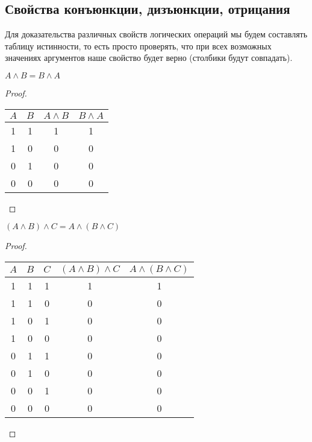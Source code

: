 \subsection{Свойства конъюнкции, дизъюнкции, отрицания}
\label{subsec:1.2.1}

\begin{remark}
	Для доказательства различных свойств логических операций мы будем составлять таблицу истинности, то есть просто проверять, что при всех возможных значениях аргументов наше свойство будет верно (столбики будут совпадать).
\end{remark}

\begin{theorem}
	$A \land B = B \land A$
\end{theorem}

\begin{proof}
	\hfill \break \break
	\begin{center}
		\begin{tabular}{ |c|c|c|c| } 
			\hline
			$A$ & $B$ & $A \land B $ & $B \land A$ \\
			\hline 
			1 & 1 & 1 & 1 \\ 
			1 & 0 & 0 & 0 \\
			0 & 1 & 0 & 0 \\ 
			0 & 0 & 0 & 0 \\  
			\hline
		\end{tabular}
	\end{center}
\end{proof}

\begin{theorem}
	$(A \land B) \land C = A \land (B \land C)$
\end{theorem}

\begin{proof}
	\hfill \break \break
	\begin{center}
		\begin{tabular}{ |c|c|c|c|c| } 
			\hline
			$A$ & $B$ & $C$ & $(A \land B) \land C$ & $A \land (B \land C)$ \\
			\hline 
			1 & 1 & 1 & 1 & 1 \\ 
			1 & 1 & 0 & 0 & 0 \\ 
			1 & 0 & 1 & 0 & 0 \\ 
			1 & 0 & 0 & 0 & 0 \\
			0 & 1 & 1 & 0 & 0 \\ 
			0 & 1 & 0 & 0 & 0 \\ 
			0 & 0 & 1 & 0 & 0 \\ 
			0 & 0 & 0 & 0 & 0 \\ 
			\hline
		\end{tabular}
	\end{center}
\end{proof}

